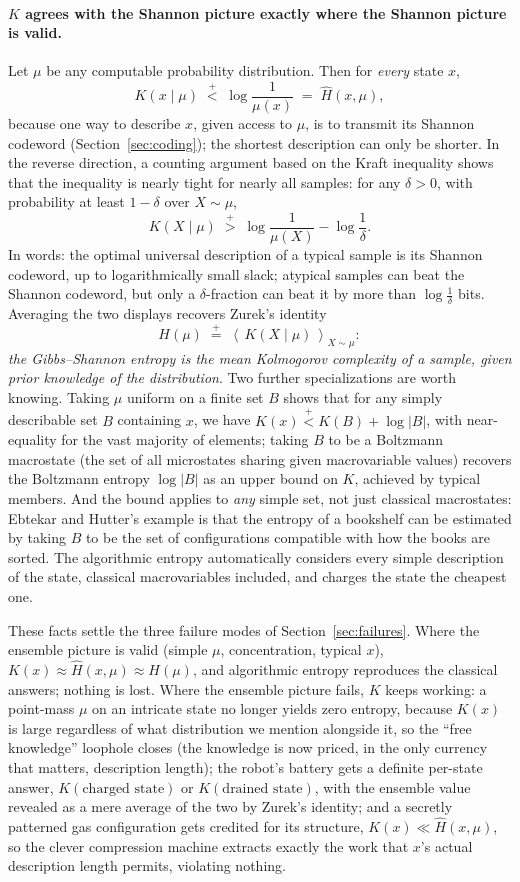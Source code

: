 \documentclass[10pt]{article}
\theoremstyle{definition}
\theoremstyle{remark}
\newcommand{\plt}{\mathrel{\stackrel{+}{<}}}
\newcommand{\pgt}{\mathrel{\stackrel{+}{>}}}
\newcommand{\peq}{\mathrel{\stackrel{+}{=}}}
\newcommand{\E}[1]{\left\langle #1 \right\rangle}
\begin{document}
\paragraph{$K$ agrees with the Shannon picture exactly where the Shannon picture is valid.} Let $\mu$ be any computable probability distribution. Then for \emph{every} state $x$,
\[
K(x \mid \mu) \;\plt\; \log \frac{1}{\mu(x)} \;=\; \hat H(x, \mu),
\]
because one way to describe $x$, given access to $\mu$, is to transmit its Shannon codeword (Section~\ref{sec:coding}); the shortest description can only be shorter. In the reverse direction, a counting argument based on the Kraft inequality shows that the inequality is nearly tight for nearly all samples: for any $\delta > 0$, with probability at least $1 - \delta$ over $X \sim \mu$,
\[
K(X \mid \mu) \;\pgt\; \log\frac{1}{\mu(X)} - \log \frac1\delta .
\]
In words: the optimal universal description of a typical sample is its Shannon codeword, up to logarithmically small slack; atypical samples can beat the Shannon codeword, but only a $\delta$-fraction can beat it by more than $\log\frac1\delta$ bits. Averaging the two displays recovers Zurek's identity
\[
H(\mu) \;\peq\; \E{\,K(X \mid \mu)\,}_{X \sim \mu} :
\]
\emph{the Gibbs--Shannon entropy is the mean Kolmogorov complexity of a sample, given prior knowledge of the distribution}. Two further specializations are worth knowing. Taking $\mu$ uniform on a finite set $B$ shows that for any simply describable set $B$ containing $x$, we have $K(x) \plt K(B) + \log |B|$, with near-equality for the vast majority of elements; taking $B$ to be a Boltzmann macrostate (the set of all microstates sharing given macrovariable values) recovers the Boltzmann entropy $\log|B|$ as an upper bound on $K$, achieved by typical members. And the bound applies to \emph{any} simple set, not just classical macrostates: Ebtekar and Hutter's example is that the entropy of a bookshelf can be estimated by taking $B$ to be the set of configurations compatible with how the books are sorted. The algorithmic entropy automatically considers every simple description of the state, classical macrovariables included, and charges the state the cheapest one.

These facts settle the three failure modes of Section~\ref{sec:failures}. Where the ensemble picture is valid (simple $\mu$, concentration, typical $x$), $K(x) \approx \hat H(x,\mu) \approx H(\mu)$, and algorithmic entropy reproduces the classical answers; nothing is lost. Where the ensemble picture fails, $K$ keeps working: a point-mass $\mu$ on an intricate state no longer yields zero entropy, because $K(x)$ is large regardless of what distribution we mention alongside it, so the ``free knowledge'' loophole closes (the knowledge is now priced, in the only currency that matters, description length); the robot's battery gets a definite per-state answer, $K(\text{charged state})$ or $K(\text{drained state})$, with the ensemble value revealed as a mere average of the two by Zurek's identity; and a secretly patterned gas configuration gets credited for its structure, $K(x) \ll \hat H(x,\mu)$, so the clever compression machine extracts exactly the work that $x$'s actual description length permits, violating nothing.
\end{document}
